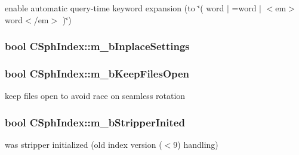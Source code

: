 enable automatic query-\/time keyword expansion (to \char`\"{}( word $|$ =word $|$ $<$em$>$word$<$/em$>$ )\char`\"{}) 

\hypertarget{classCSphIndex_aa7d5d09a537af3ed6eb762570a9cb3a6}{
\subsubsection[{m\-\_\-b\-Inplace\-Settings}]{\setlength{\rightskip}{0pt plus 5cm}bool C\-Sph\-Index\-::m\-\_\-b\-Inplace\-Settings\hspace{0.3cm}{\ttfamily [protected]}}}\label{classCSphIndex_aa7d5d09a537af3ed6eb762570a9cb3a6}
\hypertarget{classCSphIndex_a54274ee85403084d17762c73f66039ab}{
\subsubsection[{m\-\_\-b\-Keep\-Files\-Open}]{\setlength{\rightskip}{0pt plus 5cm}bool C\-Sph\-Index\-::m\-\_\-b\-Keep\-Files\-Open\hspace{0.3cm}{\ttfamily [protected]}}}\label{classCSphIndex_a54274ee85403084d17762c73f66039ab}


keep files open to avoid race on seamless rotation 

\hypertarget{classCSphIndex_a43b4e8669a77db805d1d30d0325e6794}{
\subsubsection[{m\-\_\-b\-Stripper\-Inited}]{\setlength{\rightskip}{0pt plus 5cm}bool C\-Sph\-Index\-::m\-\_\-b\-Stripper\-Inited\hspace{0.3cm}{\ttfamily [protected]}}}\label{classCSphIndex_a43b4e8669a77db805d1d30d0325e6794}


was stripper initialized (old index version ($<$9) handling) 

